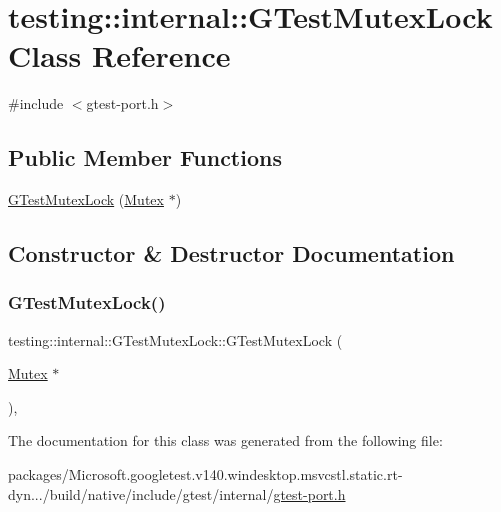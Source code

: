 \hypertarget{classtesting_1_1internal_1_1_g_test_mutex_lock}{}\section{testing\+::internal\+::G\+Test\+Mutex\+Lock Class Reference}
\label{classtesting_1_1internal_1_1_g_test_mutex_lock}


{\ttfamily \#include $<$gtest-\/port.\+h$>$}

\subsection*{Public Member Functions}
\begin{DoxyCompactItemize}
\item 
\mbox{\hyperlink{classtesting_1_1internal_1_1_g_test_mutex_lock_a77e3cba326d5356b4a1dea3790559c26}{G\+Test\+Mutex\+Lock}} (\mbox{\hyperlink{classtesting_1_1internal_1_1_mutex}{Mutex}} $\ast$)
\end{DoxyCompactItemize}


\subsection{Constructor \& Destructor Documentation}
\mbox{\label{classtesting_1_1internal_1_1_g_test_mutex_lock_a77e3cba326d5356b4a1dea3790559c26}} 
\subsubsection{\texorpdfstring{GTestMutexLock()}{GTestMutexLock()}}
{\footnotesize\ttfamily testing\+::internal\+::\+G\+Test\+Mutex\+Lock\+::\+G\+Test\+Mutex\+Lock (\begin{DoxyParamCaption}\item[{\mbox{\hyperlink{classtesting_1_1internal_1_1_mutex}{Mutex}} $\ast$}]{ }\end{DoxyParamCaption})\hspace{0.3cm}{\ttfamily [inline]}, {\ttfamily [explicit]}}



The documentation for this class was generated from the following file\+:\begin{DoxyCompactItemize}
\item 
packages/\+Microsoft.\+googletest.\+v140.\+windesktop.\+msvcstl.\+static.\+rt-\/dyn.../build/native/include/gtest/internal/\mbox{\hyperlink{gtest-port_8h}{gtest-\/port.\+h}}\end{DoxyCompactItemize}
